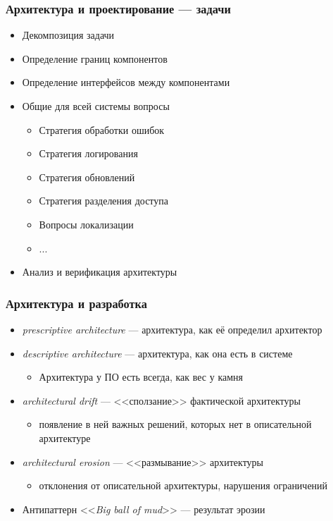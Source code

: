 \documentclass{../../slides-style}
\begin{document}
    \begin{frame}
        \frametitle{Архитектура и проектирование --- задачи}
        \begin{itemize}
            \item Декомпозиция задачи
            \item Определение границ компонентов
            \item Определение интерфейсов между компонентами
            \item Общие для всей системы вопросы
            \begin{itemize}
                \item Стратегия обработки ошибок
                \item Стратегия логирования
                \item Стратегия обновлений
                \item Стратегия разделения доступа
                \item Вопросы локализации
                \item ...
            \end{itemize}
            \item Анализ и верификация архитектуры
        \end{itemize}
    \end{frame}

    \begin{frame}
        \frametitle{Архитектура и разработка}
        \begin{itemize}
            \item \emph{prescriptive architecture} --- архитектура, как её определил архитектор
            \item \emph{descriptive architecture} --- архитектура, как она есть в системе
            \begin{itemize}
                \item Архитектура у ПО есть всегда, как вес у камня
            \end{itemize}
            \item \emph{architectural drift} --- <<сползание>> фактической архитектуры
            \begin{itemize}
                \item появление в ней важных решений, которых нет в описательной архитектуре
            \end{itemize}
            \item \emph{architectural erosion} --- <<размывание>> архитектуры
            \begin{itemize}
                \item отклонения от описательной архитектуры, нарушения ограничений
            \end{itemize}
            \item Антипаттерн <<\emph{Big ball of mud}>> --- результат эрозии
        \end{itemize}
    \end{frame}
\end{document}
